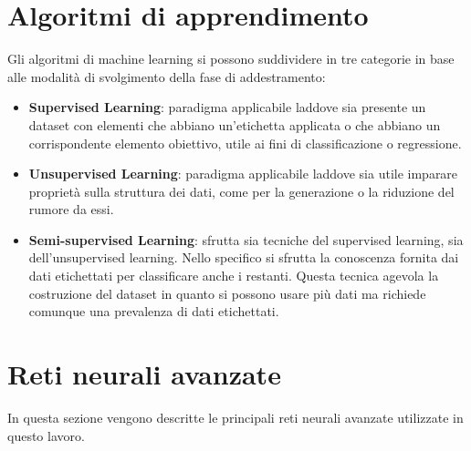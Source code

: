 		\section{Algoritmi di apprendimento}
		Gli algoritmi di machine learning si possono suddividere in tre categorie in base alle modalità di svolgimento della fase di addestramento\cite{deep-learning-book}:
		\begin{itemize}
			\item \textbf{Supervised Learning}: paradigma applicabile laddove sia presente un dataset con elementi che abbiano un'etichetta applicata o che abbiano un corrispondente elemento obiettivo, utile ai fini di classificazione o regressione.
			\item \textbf{Unsupervised Learning}: paradigma applicabile laddove sia utile imparare proprietà sulla struttura dei dati, come per la generazione o la riduzione del rumore da essi.
			\item \textbf{Semi-supervised Learning}: sfrutta sia tecniche del supervised learning, sia dell'unsupervised learning. Nello specifico si sfrutta la conoscenza fornita dai dati etichettati per classificare anche i restanti. Questa tecnica agevola la costruzione del dataset in quanto si possono usare più dati ma richiede comunque una prevalenza di dati etichettati.
		\end{itemize}
		
		\section{Reti neurali avanzate}
		In questa sezione vengono descritte le principali reti neurali avanzate utilizzate in questo lavoro.
		
